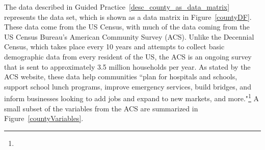 \noindent The data described in Guided
Practice~\ref{desc_county_as_data_matrix} represents the
 data set, which is shown as a data matrix
in Figure~\ref{countyDF}.
These data come from the US Census, with much of
the data coming from the US Census Bureau's American
Community Survey (ACS).
Unlike the Decennial Census, which takes place every 10 years and attempts to collect basic demographic data from every resident of the US, the ACS is an ongoing survey that is sent to approximately 3.5 million households per year.
As stated by the ACS website, these data help communities ``plan for hospitals and schools, support school lunch programs, improve emergency services, build bridges, and inform businesses looking to add jobs and expand to new markets, and more."\footnote{}
A small subset of the variables from the ACS are summarized in Figure~\ref{countyVariables}.

\D{\newpage}

